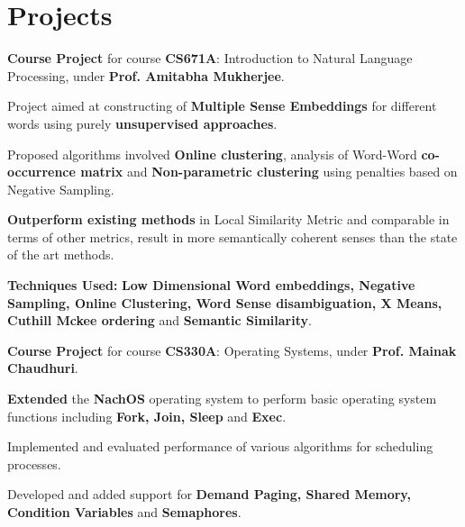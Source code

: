 \documentclass[a4paper]{norm-resume} %
\begin{document}
\vspace{0mm}	%


\section{Projects}

\vspace{2mm} %

						
	\begin{tightitemize}
	\small
	{
	\item \textbf{Course Project} for course \textbf{CS671A}: Introduction to Natural Language Processing, under \textbf{Prof. Amitabha Mukherjee}.
	\item Project aimed at constructing of \textbf{Multiple Sense Embeddings} for different words using purely \textbf{unsupervised approaches}.
	\item Proposed algorithms involved \textbf{Online clustering}, analysis of Word-Word \textbf{co-occurrence matrix} and \textbf{Non-parametric clustering} using penalties based on Negative Sampling.
	\item \textbf{Outperform existing methods} in Local Similarity Metric and comparable in terms of other metrics, result in more semantically coherent senses than the state of the art methods.
	\item \textbf{Techniques Used:} \textbf{Low Dimensional Word embeddings, Negative Sampling, Online Clustering, Word Sense disambiguation, X Means, Cuthill Mckee ordering} and \textbf{Semantic Similarity}.
	}
	\end{tightitemize}
		
	\vspace{2mm}

	   \descript{July '15 - Nov '15}
	\begin{tightitemize}
	\small
	{
	\item \textbf{Course Project} for course \textbf{CS330A}: Operating Systems, under \textbf{Prof. Mainak Chaudhuri}.
	\item \textbf{Extended} the \textbf{NachOS} operating system to perform basic operating system functions including \textbf{Fork, Join, Sleep} and \textbf{Exec}. 
	\item Implemented and evaluated performance of various algorithms for scheduling processes.
	\item Developed and added support for \textbf{Demand Paging, Shared Memory, Condition Variables} and \textbf{Semaphores}.	
	}
	\end{tightitemize}
		
\end{document}
